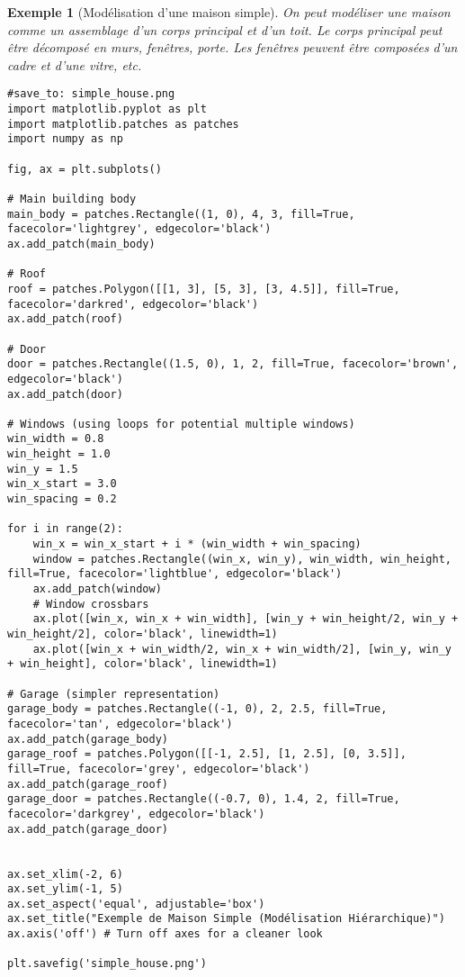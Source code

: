 \documentclass{article}
\newtheorem{example}{Exemple}
\begin{document}
\begin{example}[Modélisation d'une maison simple]
On peut modéliser une maison comme un assemblage d'un corps principal et d'un toit. Le corps principal peut être décomposé en murs, fenêtres, porte. Les fenêtres peuvent être composées d'un cadre et d'une vitre, etc.

\begin{verbatim}
#save_to: simple_house.png
import matplotlib.pyplot as plt
import matplotlib.patches as patches
import numpy as np

fig, ax = plt.subplots()

# Main building body
main_body = patches.Rectangle((1, 0), 4, 3, fill=True, facecolor='lightgrey', edgecolor='black')
ax.add_patch(main_body)

# Roof
roof = patches.Polygon([[1, 3], [5, 3], [3, 4.5]], fill=True, facecolor='darkred', edgecolor='black')
ax.add_patch(roof)

# Door
door = patches.Rectangle((1.5, 0), 1, 2, fill=True, facecolor='brown', edgecolor='black')
ax.add_patch(door)

# Windows (using loops for potential multiple windows)
win_width = 0.8
win_height = 1.0
win_y = 1.5
win_x_start = 3.0
win_spacing = 0.2

for i in range(2):
    win_x = win_x_start + i * (win_width + win_spacing)
    window = patches.Rectangle((win_x, win_y), win_width, win_height, fill=True, facecolor='lightblue', edgecolor='black')
    ax.add_patch(window)
    # Window crossbars
    ax.plot([win_x, win_x + win_width], [win_y + win_height/2, win_y + win_height/2], color='black', linewidth=1)
    ax.plot([win_x + win_width/2, win_x + win_width/2], [win_y, win_y + win_height], color='black', linewidth=1)

# Garage (simpler representation)
garage_body = patches.Rectangle((-1, 0), 2, 2.5, fill=True, facecolor='tan', edgecolor='black')
ax.add_patch(garage_body)
garage_roof = patches.Polygon([[-1, 2.5], [1, 2.5], [0, 3.5]], fill=True, facecolor='grey', edgecolor='black')
ax.add_patch(garage_roof)
garage_door = patches.Rectangle((-0.7, 0), 1.4, 2, fill=True, facecolor='darkgrey', edgecolor='black')
ax.add_patch(garage_door)


ax.set_xlim(-2, 6)
ax.set_ylim(-1, 5)
ax.set_aspect('equal', adjustable='box')
ax.set_title("Exemple de Maison Simple (Modélisation Hiérarchique)")
ax.axis('off') # Turn off axes for a cleaner look

plt.savefig('simple_house.png')
\end{verbatim}


\end{example}
\end{document}
